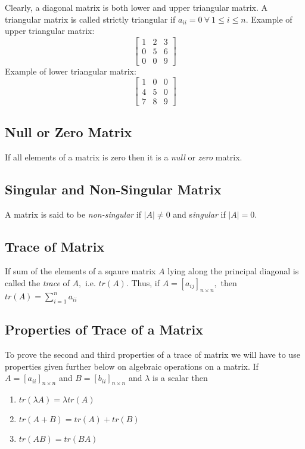 Clearly, a diagonal matrix is both lower and upper triangular matrix. A triangular matrix is called strictly triangular if $a_{ii}
= 0~\forall~1\leq i \leq n$. Example of upper triangular matrix:
\[\begin{bmatrix}1 & 2 & 3\\0 & 5 & 6\\0 & 0 & 9\end{bmatrix}\]
Example of lower triangular matrix:
\[\begin{bmatrix}1 & 0 & 0\\4 & 5 & 0\\7 & 8 & 9\end{bmatrix}\]

\subsection{Null or Zero Matrix}
If all elements of a matrix is zero then it is a \textit{null} or \textit{zero} matrix.

\subsection{Singular and Non-Singular Matrix}
A matrix is said to be \textit{non-singular} if $|A|\neq 0$ and s\textit{ingular} if $|A| = 0$.

\subsection{Trace of Matrix}
If sum of the elements of a sqaure matrix $A$ lying along the principal diagonal is called the \textit{trace} of $A,$
i.e. $tr(A)$. Thus, if $A = [a_{ij}]_{n\times n},$ then $tr(A) = \sum_{i = 1}^n a_{ii}$

\subsection{Properties of Trace of a Matrix}
To prove the second and third properties of a trace of matrix we will have to use properties given further below on algebraic
operations on a matrix. If $A = [a_{ii}]_{n\times n}$ and $B = [b_{ii}]_{n\times n}$ and $\lambda$ is a scalar then

\begin{enumerate}
\item $tr(\lambda A) = \lambda tr(A)$
\item $tr(A + B) = tr(A) + tr(B)$
\item $tr(AB) = tr(BA)$
\end{enumerate}


